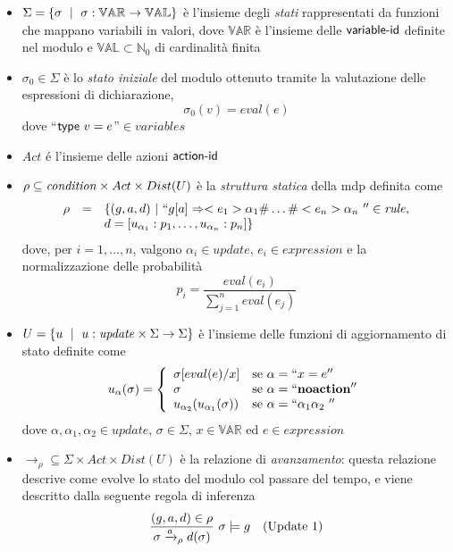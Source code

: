 \begin{itemize}
	\item $\Sigma = \{\sigma \mbox{ }\mid\mbox{ } \sigma : \mathbb{VAR} \rightarrow \mathbb{VAL}\}$ è l'insieme degli \emph{stati} rappresentati da funzioni che mappano variabili in valori, dove $\mathbb{VAR}$ è l'insieme delle ${\sf variable}\textrm{-}{\sf id}$ definite nel modulo e $\mathbb{VAL} \subset \mathbb{N}_0$ di cardinalità finita
	\item $\sigma_0 \in \Sigma$ è lo \emph{stato iniziale} del modulo ottenuto tramite la valutazione delle espressioni di dichiarazione,
	$$ \sigma_0(v) = eval(e)$$
	dove ``${\sf type} \mbox{ } v = e$''$\in \mathit{variables}$
	\item $Act$ é l'insieme delle azioni ${\sf action}\textrm{-}{\sf id}$
	\item $\rho \subseteq \space \mathit{condition} \space \times Act \times Dist(U)$ è la \emph{struttura statica} della \ac{mdp} definita come
	$$
	\begin{array}{rcl}
		\rho &=& \{(g,a,d)\ |\ ``g[a] \Rightarrow <e_1> \alpha_1 \# \dots \# <e_n> \alpha_n \ '' \in \mathit{rule}, \\
		&& d=[u_{\alpha_{1}}:p_1, \dots, u_{\alpha_{n}}:p_n]\} \\
	\end{array}
	$$
	dove, per $i=1,\dots,n$, valgono $\alpha_i \in \mathit{update}$, $e_i \in \mathit{expression}$ e la normalizzazione delle probabilità
	$$ p_i = \frac{eval(e_i)}{\sum_{j=1}^{n}eval(e_j)}$$
	\item $U = \{u \mbox{ }\mid\mbox{ } u : \mathit{update} \times \Sigma \rightarrow \Sigma \}$ è l'insieme delle funzioni di aggiornamento di stato definite come
	$$ 
	u_\alpha(\sigma) = \left\{
	\begin{array}{ll}
		\sigma[eval(e)/x]	& \mbox{se } \alpha = ``x = e'' \\
		\sigma				& \mbox{se } \alpha = ``\mathbf{noaction}'' \\
		u_{\alpha_2}(u_{\alpha_1}(\sigma))	& \mbox{se } \alpha = ``\alpha_1 \alpha_2 \ '' \\
	\end{array}
	\right.
	$$
	dove $\alpha, \alpha_1, \alpha_2 \in \mathit{update}$, $\sigma \in \Sigma$, $x \in \mathbb{VAR}$ ed $e \in \mathit{expression}$
	\item $\rightarrow_\rho \subseteq \Sigma \times Act \times Dist(U)$ è la relazione di \emph{avanzamento}: questa relazione descrive come evolve lo stato del modulo col passare del tempo, e viene descritto dalla seguente regola di inferenza
	$$
	\begin{array}{cl}
		\displaystyle{\frac{(g,a,d) \in \rho}{\sigma \xrightarrow{a}_\rho d(\sigma)} \mbox{ }\sigma \models g} & \mbox{(Update 1)} \\
	\end{array}
	$$
\end{itemize}

